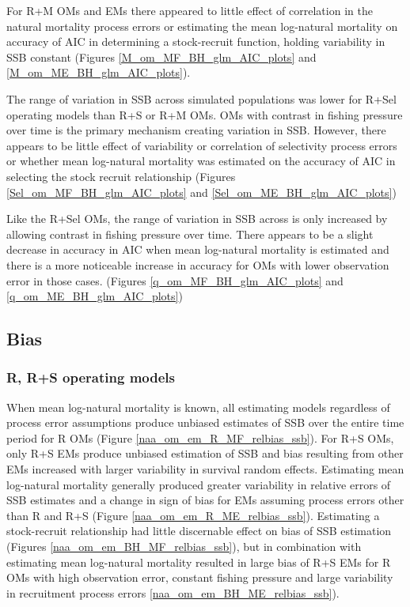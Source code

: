 \documentclass[
  12pt,
]{article}
\begin{document}
For R+M OMs and EMs there appeared to little effect of correlation in
the natural mortality process errors or estimating the mean log-natural
mortality on accuracy of AIC in determining a stock-recruit function,
holding variability in SSB constant (Figures
\ref{M_om_MF_BH_glm_AIC_plots} and \ref{M_om_ME_BH_glm_AIC_plots}).

The range of variation in SSB across simulated populations was lower for
R+Sel operating models than R+S or R+M OMs. OMs with contrast in fishing
pressure over time is the primary mechanism creating variation in SSB.
However, there appears to be little effect of variability or correlation
of selectivity process errors or whether mean log-natural mortality was
estimated on the accuracy of AIC in selecting the stock recruit
relationship (Figures \ref{Sel_om_MF_BH_glm_AIC_plots} and
\ref{Sel_om_ME_BH_glm_AIC_plots})

Like the R+Sel OMs, the range of variation in SSB across is only
increased by allowing contrast in fishing pressure over time. There
appears to be a slight decrease in accuracy in AIC when mean log-natural
mortality is estimated and there is a more noticeable increase in
accuracy for OMs with lower observation error in those cases. (Figures
\ref{q_om_MF_BH_glm_AIC_plots} and \ref{q_om_ME_BH_glm_AIC_plots})

\hypertarget{bias-1}{%
\subsection*{Bias}\label{bias-1}}

\hypertarget{r-rs-operating-models-2}{%
\subsubsection*{R, R+S operating models}\label{r-rs-operating-models-2}}

When mean log-natural mortality is known, all estimating models
regardless of process error assumptions produce unbiased estimates of
SSB over the entire time period for R OMs (Figure
\ref{naa_om_em_R_MF_relbias_ssb}). For R+S OMs, only R+S EMs produce
unbiased estimation of SSB and bias resulting from other EMs increased
with larger variability in survival random effects. Estimating mean
log-natural mortality generally produced greater variability in relative
errors of SSB estimates and a change in sign of bias for EMs assuming
process errors other than R and R+S (Figure
\ref{naa_om_em_R_ME_relbias_ssb}). Estimating a stock-recruit
relationship had little discernable effect on bias of SSB estimation
(Figures \ref{naa_om_em_BH_MF_relbias_ssb}), but in combination with
estimating mean log-natural mortality resulted in large bias of R+S EMs
for R OMs with high observation error, constant fishing pressure and
large variability in recruitment process errors
\ref{naa_om_em_BH_ME_relbias_ssb}).
\end{document}
